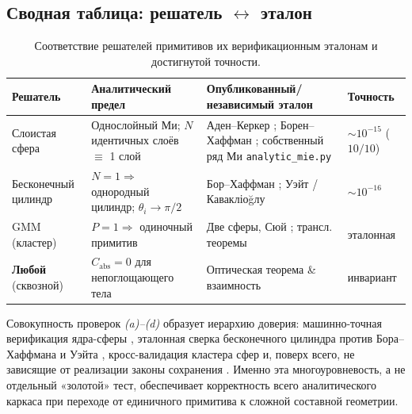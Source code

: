 \documentclass[11pt,a4paper]{article}
\begin{document}
\subsection{Сводная таблица: решатель $\leftrightarrow$ эталон}
\label{decomp-ssec:verif-table}

\begin{table}[htbp]
\centering
\caption{Соответствие решателей примитивов их верификационным эталонам и достигнутой точности.}
\label{decomp-tab:verif-map}
\small
\begin{tabular}{@{}p{3.0cm}p{3.0cm}p{4.2cm}p{2.4cm}@{}}
\toprule
\textbf{Решатель} & \textbf{Аналитический предел} & \textbf{Опубликованный/независимый эталон} & \textbf{Точность} \\
\midrule
Слоистая сфера &
Однослойный Ми; $N$ идентичных слоёв $\equiv$ 1 слой &
Аден--Керкер \cite{aden1951}; Борен--Хаффман \cite{bohren1983}; собственный ряд Ми \texttt{analytic\_mie.py} &
$\sim10^{-15}$ ($10/10$) \\[2pt]
Бесконечный цилиндр &
$N{=}1\Rightarrow$ однородный цилиндр; $\theta_i\to\pi/2$ &
Бор--Хаффман \cite{bohren1983}; Уэйт \cite{wait1955} / Кавакліоğлу \cite{kavaklioglu2008} &
$\sim10^{-16}$ \\[2pt]
GMM (кластер) &
$P=1\Rightarrow$ одиночный примитив &
Две сферы, Сюй \cite{xu1995}; трансл. теоремы \cite{stein1961,cruzan1962} &
эталонная \\[2pt]
\textbf{Любой} (сквозной) &
$C_{\mathrm{abs}}\!=\!0$ для непоглощающего тела &
Оптическая теорема \& взаимность \cite{mishchenko2002,bohren1983} &
инвариант \\
\bottomrule
\end{tabular}
\end{table}

Совокупность проверок \emph{(a)--(d)} образует иерархию доверия: машинно-точная верификация ядра-сферы \cite{aden1951,bohren1983}, эталонная сверка бесконечного цилиндра против Бора--Хаффмана и Уэйта \cite{bohren1983,wait1955}, кросс-валидация кластера сфер \cite{xu1995} и, поверх всего, не зависящие от реализации законы сохранения \cite{mishchenko2002}. Именно эта многоуровневость, а не отдельный «золотой» тест, обеспечивает корректность всего аналитического каркаса при переходе от единичного примитива к сложной составной геометрии.
\end{document}
